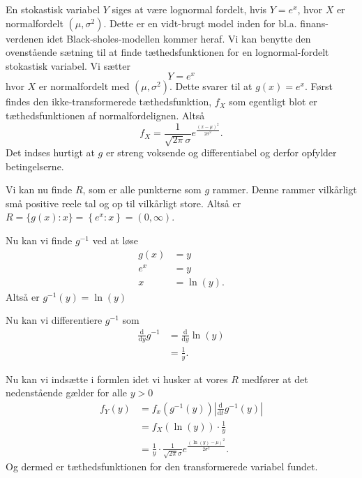 \begin{eks} 
  En stokastisk variabel $Y$ siges at være lognormal fordelt, hvis $Y = e^{x}$, hvor $X$ er normalfordelt $(\mu, \sigma^2)$. Dette er en vidt-brugt model inden for bl.a. finans-verdenen idet Black-sholes-modellen kommer heraf. Vi kan benytte den ovenstående sætning  til at finde tæthedsfunktionen for en lognormal-fordelt stokastisk variabel.
  \bigbreak
  Vi sætter
  \[ 
  Y = e^{x}
  \]
  hvor $X$ er normalfordelt med $\left(\mu, \sigma^2\right)$. Dette svarer til at $g(x) = e^{x}$. Først findes den ikke-transformerede tæthedsfunktion, $f_X$ som egentligt blot er tæthedsfunktionen af normalfordelignen. Altså
  \[ 
  f_X = \frac{1}{\sqrt{2\pi}\sigma}e^{\frac{(x-\mu)^2}{2\sigma^2}}
  .\]
  Det indses hurtigt at $g$ er streng voksende og differentiabel og derfor opfylder betingelserne. 

  Vi kan nu finde $R$, som er alle punkterne som $g$ rammer. Denne rammer vilkårligt små positive reele tal og op til vilkårligt store. Altså er $R = \{g(x): x\} = \left\{ e^{x}: x \right\} = (0, \infty)$.

  Nu kan vi finde $g^{-1}$ ved at løse
  \begin{align*}
    g(x) &= y \\
    e^{x} &= y \\
    x &= \ln(y)
  .\end{align*}
  Altså er $g^{-1}(y) = \ln(y)$

  Nu kan vi differentiere $g^{-1}$ som
  \begin{align*}
    \frac{\mathrm{d}}{\mathrm{d}y} g^{-1} &= \frac{\mathrm{d}}{\mathrm{d}y} \ln(y) \\
    &= \frac{1}{y}
  .\end{align*}

  Nu kan vi indsætte i formlen idet vi husker at vores $R$ medfører at det nedenstående gælder for alle $y > 0$
  \begin{align*}
    f_Y(y) &= f_x \left( g^{-1}(y) \right) \left| \frac{\mathrm{d}}{\mathrm{d}t} g^{-1}(y) \right| \\
          &= f_X \left( \ln(y) \right) \cdot \frac{1}{y} \\
          &= \frac{1}{y}\cdot  \frac{1}{\sqrt{2\pi}\sigma}e^{\frac{(\ln(y)-\mu)^2}{2\sigma^2}}
  .\end{align*}
  Og dermed er tæthedsfunktionen for den transformerede variabel fundet.
\end{eks}

